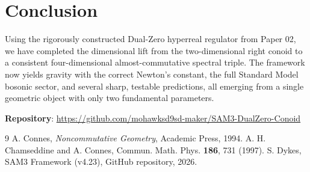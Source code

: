 \documentclass[11pt,a4paper]{article}
\begin{document}
\section{Conclusion}

Using the rigorously constructed Dual-Zero hyperreal regulator from Paper 02, we have completed the dimensional lift from the two-dimensional right conoid to a consistent four-dimensional almost-commutative spectral triple. The framework now yields gravity with the correct Newton’s constant, the full Standard Model bosonic sector, and several sharp, testable predictions, all emerging from a single geometric object with only two fundamental parameters.

\vspace{1em}
\textbf{Repository}: \url{https://github.com/mohawksd9sd-maker/SAM3-DualZero-Conoid}

\begin{thebibliography}{9}
 A. Connes, \textit{Noncommutative Geometry}, Academic Press, 1994.
 A. H. Chamseddine and A. Connes, Commun. Math. Phys. \textbf{186}, 731 (1997).
 S. Dykes, SAM3 Framework (v4.23), GitHub repository, 2026.
\end{thebibliography}
\end{document}
